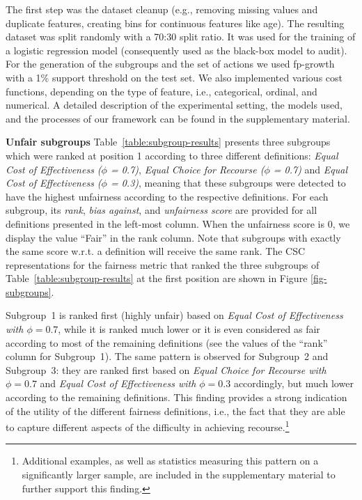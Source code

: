 \documentclass{article}
\begin{document}
The first step was the dataset cleanup (e.g., removing missing values and duplicate features, creating bins for continuous features like age). The resulting dataset was split randomly with a  70:30 split ratio. It was used for the training of a logistic regression model (consequently used as the black-box model to audit). For the generation of the subgroups and the set of actions we used fp-growth with a 1\% support threshold on the test set. We also implemented various cost functions, depending on the type of feature, i.e., categorical, ordinal, and numerical. A detailed description of the experimental setting, the models used, and the processes of our framework can be found in the supplementary material.


\smallskip\noindent\textbf{Unfair subgroups}
Table~\ref{table:subgroup-results} presents three subgroups
which were ranked at position 1 according to three different definitions: \textit{Equal Cost of Effectiveness ($\phi$ = 0.7)}, \textit{Equal Choice for Recourse ($\phi$ = 0.7)} and \textit{Equal Cost of Effectiveness ($\phi$ = 0.3)}, meaning that these subgroups were detected to have the highest unfairness according to the respective definitions.
For each subgroup, its \textit{rank}, \textit{bias against}, and \textit{unfairness score} are provided for all definitions presented in the left-most column. When the unfairness score is 0, we display the value ``Fair'' in the rank column. Note that subgroups with exactly the same score w.r.t. a definition will receive the same rank. The CSC representations for the fairness metric that ranked the three subgroups of Table~\ref{table:subgroup-results} at the first position are shown in Figure \ref{fig-subgroups}.


Subgroup~1 is ranked first (highly unfair) based on \textit{Equal Cost of Effectiveness with $\phi=0.7$}, while it is ranked much lower or it is even considered as fair according to most of the remaining definitions (see the values of the ``rank'' column for Subgroup~1). The same pattern is observed for Subgroup~2 and Subgroup~3: they are ranked first based on \textit{Equal Choice for Recourse with $\phi=0.7$} and \textit{Equal Cost of Effectiveness with $\phi=0.3$} accordingly, but much lower according to the remaining definitions. This finding provides a strong indication of the utility of the different fairness definitions, i.e., the fact that they are able to capture different aspects of the difficulty in achieving recourse.\footnote{Additional examples, as well as statistics measuring this pattern on a significantly larger sample, are included in the supplementary material to further support this finding.}
\end{document}
